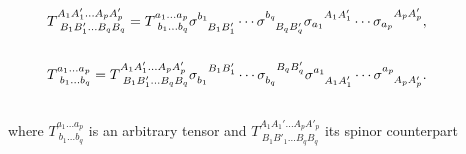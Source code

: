 \documentclass[final,3p,times,twocolumn]{elsarticle}
\begin{document}
\begin{eqnarray}
&&\hspace{-1.5cm}T^{A_1A_1'\dots A_pA'_p}_{\ B_1B'_1\dots B_qB_q}
=T^{a_1\dots a_p}_{\ b_1\dots b_q}
\sigma^{b_1}_{\phantom{b_1}B_1B'_1}\cdots\sigma^{b_q}_{\phantom{b_q}B_qB'_q}
\sigma_{a_1}^{\phantom{a_1}A_1A'_1}\cdots\sigma_{a_p}^{\phantom{a_p}A_pA'_p},\nonumber\\ 
&&\label{ivv}\\
&&\hspace{-1.5cm}T^{a_1\dots a_p}_{\  b_1\dots b_q}=T^{ A_1A_1'\dots A_pA'_p}_{\  B_1B'_1\dots B_qB_q}
\sigma_{b_1}^{\phantom{b_1}B_1B'_1}\cdots\sigma_{b_q}^{\phantom{b_q}B_qB'_q}
\sigma^{a_1}_{\phantom{a_1}A_1A'_1}\cdots\sigma^{a_p}_{\phantom{a_p}A_pA'_p}.
\nonumber\\
&&\label{vvi}\;
\end{eqnarray}
 where $T^{a_1\dots a_p}_{\  b_1\dots b_q}$ is an arbitrary tensor and 
$T^{A_1A_1'\dots A_pA'_p}_{\ B_1B'_1\dots B_qB_q}$ its spinor counterpart 
\end{document}
